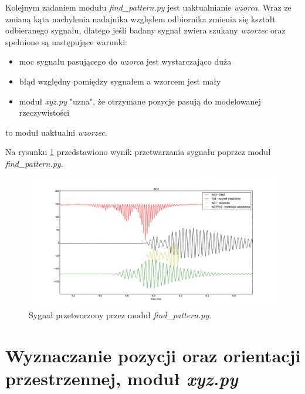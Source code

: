  Kolejnym zadaniem modułu \textit{find\_pattern.py} jest uaktualnianie \textit{wzorca}.
 Wraz ze zmianą kąta nachylenia nadajnika względem odbiornika zmienia się kształt odbieranego sygnału,
 dlatego jeśli badany sygnał zwiera szukany \textit{wzorzec} oraz spełnione są następujące warunki:
 \begin{itemize}
  \item moc sygnału pasującego do \textit{wzorca} jest wystarczająco duża
  \item błąd względny pomiędzy sygnałem a wzorcem jest mały
  \item moduł \textit{xyz.py} "uzna", że otrzymane pozycje pasują do modelowanej rzeczywistości
 \end{itemize}
to moduł uaktualni \textit{wzorzec}.
  
 Na rysunku \ref{fig:blad_korel} przedstawiono wynik przetwarzania sygnału poprzez moduł \textit{find\_pattern.py}.
 
 \begin{figure}[h!]
    \centering
    \includegraphics[width=1.15\textwidth, trim= 47mm 0mm 0mm 0mm,clip]{blad_korel}
    \caption{Sygnał przetworzony przez moduł \textit{find\_pattern.py}.}
    \label{fig:blad_korel}
\end{figure}
 

 
\section{Wyznaczanie pozycji oraz orientacji przestrzennej, moduł \textit{xyz.py}}

